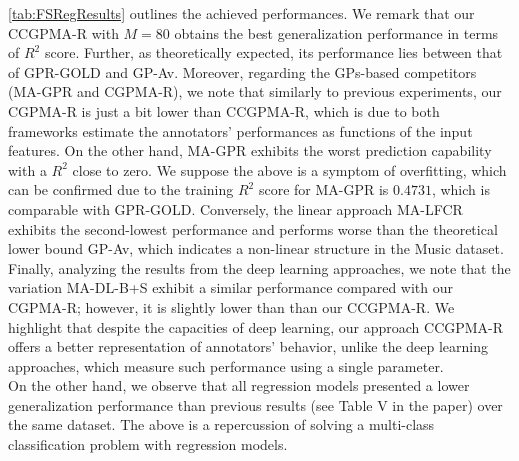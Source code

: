 \documentclass[9pt]{article}
\begin{document}
\cref{tab:FSRegResults} outlines the achieved performances. We remark that our CCGPMA-R with $M=80$ obtains the best generalization performance in terms of $R^2$ score. Further, as theoretically expected, its performance lies between that of GPR-GOLD and GP-Av. 
Moreover, regarding the GPs-based competitors (MA-GPR and CGPMA-R), we note that similarly to previous experiments, our CGPMA-R is just a bit lower than CCGPMA-R, which is due to both frameworks estimate the annotators' performances as functions of the input features. On the other hand, MA-GPR exhibits the worst prediction capability with a $R^2$ close to zero. We suppose the above is a symptom of overfitting, which can be confirmed due to the training $R^2$ score for MA-GPR is $0.4731$, which is comparable with GPR-GOLD. Conversely, the linear approach MA-LFCR exhibits the second-lowest performance and performs worse than the theoretical lower bound GP-Av, which indicates a non-linear structure in the Music dataset. Finally, analyzing the results from the deep learning approaches, we note that the variation MA-DL-B+S exhibit a similar performance compared with our CGPMA-R; however, it is slightly lower than than our CCGPMA-R. We highlight that despite the capacities of deep learning, our approach CCGPMA-R offers a better representation of annotators' behavior, unlike the deep learning approaches, which measure such performance using a single parameter.\\
On the other hand, we observe that all regression models presented a lower generalization performance than previous results (see Table V in the paper) over the same dataset. The above is a repercussion of solving a multi-class classification problem with regression models.


\footnotesize

\end{document}
